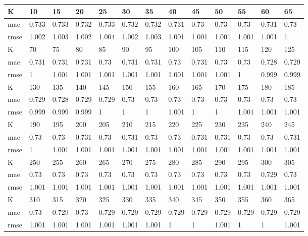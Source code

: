 \begin{appendices}
\begin{center} \label{tab10}
	\begin{tabularx}{\textwidth}{|l|X|X|X|X|X|X|X|X|X|X|X|X|} 
		\hline 
		K & 10 & 15 & 20 & 25 & 30 & 35 & 40 & 45 & 50 & 55 & 60 & 65 \\ \hline 
		mae & 0.733 & 0.733 & 0.732 & 0.733 & 0.732 & 0.732 & 0.731 & 0.73 & 0.73 & 0.73 & 0.731 & 0.73 \\ \hline 
		rmse & 1.002 & 1.003 & 1.002 & 1.004 & 1.002 & 1.003 & 1.001 & 1.001 & 1.001 & 1.001 & 1.001 & 1 \\ \hline 
		\hline 
		K & 70 & 75 & 80 & 85 & 90 & 95 & 100 & 105 & 110 & 115 & 120 & 125 \\ \hline 
		mae & 0.731 & 0.731 & 0.731 & 0.73 & 0.731 & 0.731 & 0.73 & 0.731 & 0.73 & 0.73 & 0.728 & 0.729 \\ \hline 
		rmse & 1 & 1.001 & 1.001 & 1.001 & 1.001 & 1.001 & 1.001 & 1.001 & 1.001 & 1 & 0.999 & 0.999 \\ \hline 
		\hline 
		K & 130 & 135 & 140 & 145 & 150 & 155 & 160 & 165 & 170 & 175 & 180 & 185 \\ \hline 
		mae & 0.729 & 0.728 & 0.729 & 0.729 & 0.73 & 0.73 & 0.73 & 0.73 & 0.73 & 0.73 & 0.73 & 0.73 \\ \hline 
		rmse & 0.999 & 0.999 & 0.999 & 1 & 1 & 1 & 1.001 & 1 & 1 & 1.001 & 1.001 & 1.001 \\ \hline 
		\hline 
		K & 190 & 195 & 200 & 205 & 210 & 215 & 220 & 225 & 230 & 235 & 240 & 245 \\ \hline 
		mae & 0.73 & 0.73 & 0.731 & 0.73 & 0.731 & 0.73 & 0.73 & 0.731 & 0.731 & 0.73 & 0.73 & 0.731 \\ \hline 
		rmse & 1 & 1.001 & 1.001 & 1.001 & 1.001 & 1.001 & 1.001 & 1.001 & 1.001 & 1.001 & 1.001 & 1.001 \\ \hline 
		\hline 
		K & 250 & 255 & 260 & 265 & 270 & 275 & 280 & 285 & 290 & 295 & 300 & 305 \\ \hline 
		mae & 0.73 & 0.73 & 0.73 & 0.73 & 0.73 & 0.73 & 0.73 & 0.73 & 0.73 & 0.73 & 0.729 & 0.73 \\ \hline 
		rmse & 1.001 & 1.001 & 1.001 & 1.001 & 1.001 & 1.001 & 1.001 & 1.001 & 1.001 & 1.001 & 1.001 & 1.001 \\ \hline 
		\hline 
		K & 310 & 315 & 320 & 325 & 330 & 335 & 340 & 345 & 350 & 355 & 360 & 365 \\ \hline 
		mae & 0.73 & 0.729 & 0.73 & 0.729 & 0.729 & 0.729 & 0.729 & 0.729 & 0.729 & 0.729 & 0.729 & 0.729 \\ \hline 
		rmse & 1.001 & 1.001 & 1.001 & 1.001 & 1.001 & 1.001 & 1 & 1 & 1.001 & 1 & 1 & 1.001 \\ \hline 

\end{tabularx}
\end{center}
\end{appendices}
